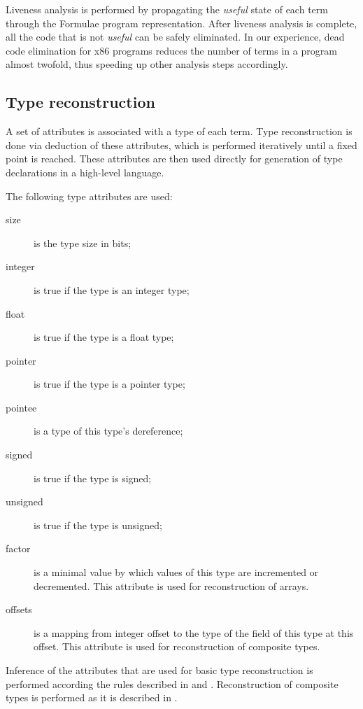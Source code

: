 \documentclass[10pt, conference, compsocconf]{IEEEtran}
\newcommand{\compact}{}
\newcommand{\skipspace}{}
\newcommand{\skipsectionspace}{}
\begin{document}
Liveness analysis is performed by propagating the \textit{useful} state of each term
through the Formulae program representation. After liveness analysis is complete, all
the code that is not \textit{useful} can be safely eliminated. 
In our experience, dead code elimination for x86 programs reduces the number of 
terms in a program almost twofold, thus speeding up other analysis steps accordingly.


\subsection{Type reconstruction}\skipsectionspace

A set of attributes is associated with a type of each term.
Type reconstruction is done via deduction of these attributes,
which is performed iteratively until a fixed point is reached.
These attributes are then used directly for generation of
type declarations in a high-level language.

The following type attributes are used:
\skipspace\begin{description}\compact
\item[size] is the type size in bits;
\item[integer] is true if the type is an integer type;
\item[float] is true if the type is a float type;
\item[pointer] is true if the type is a pointer type;
\item[pointee] is a type of this type's dereference;
\item[signed] is true if the type is signed;
\item[unsigned] is true if the type is unsigned;
\item[factor] is a minimal value by which values of this type are
incremented or decremented. 
This attribute is used for reconstruction of arrays.
\item[offsets] is a mapping from integer offset to the type
of the field of this type at this offset.
This attribute is used for reconstruction of composite types.
\end{description}

Inference of the attributes that are used for basic type reconstruction
is performed according the rules described in \cite{wcre2008} and \cite{psi_workshop}.
Reconstruction of composite types is performed as it is described in \cite{scam2010}.
\end{document}
